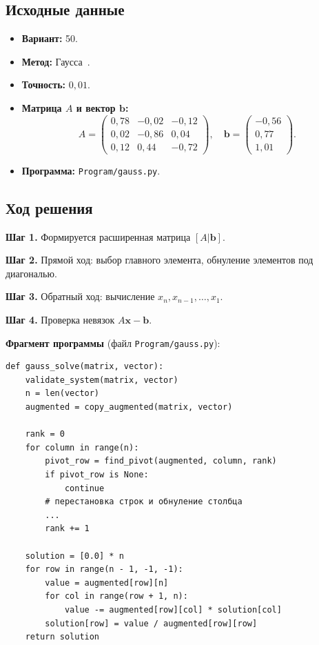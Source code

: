 \documentclass[12pt,a4paper]{scrartcl}
\begin{document}
\subsection{Исходные данные}

\begin{itemize}
 \item \textbf{Вариант:} 50.
 \item \textbf{Метод:} Гаусса~\cite{Samarsky-1989}.
 \item \textbf{Точность:} $0{,}01$.
 \item \textbf{Матрица $A$ и вектор $\mathbf{b}$:}
\[
A=\begin{pmatrix}
0{,}78 & -0{,}02 & -0{,}12\\
0{,}02 & -0{,}86 & 0{,}04\\
0{,}12 & 0{,}44 & -0{,}72
\end{pmatrix},
\quad
\mathbf{b}=\begin{pmatrix}-0{,}56\\ 0{,}77\\ 1{,}01\end{pmatrix}.
\]
 \item \textbf{Программа:} \texttt{Program/gauss.py}.
\end{itemize}

\subsection{Ход решения}

\textbf{Шаг 1.} Формируется расширенная матрица $[A|\mathbf{b}]$.

\textbf{Шаг 2.} Прямой ход: выбор главного элемента, обнуление элементов под диагональю.

\textbf{Шаг 3.} Обратный ход: вычисление $x_n, x_{n-1}, \ldots, x_1$.

\textbf{Шаг 4.} Проверка невязок $A\mathbf{x}-\mathbf{b}$.

\textbf{Фрагмент программы} (файл \texttt{Program/gauss.py}):
\begin{verbatim}
def gauss_solve(matrix, vector):
    validate_system(matrix, vector)
    n = len(vector)
    augmented = copy_augmented(matrix, vector)

    rank = 0
    for column in range(n):
        pivot_row = find_pivot(augmented, column, rank)
        if pivot_row is None:
            continue
        # перестановка строк и обнуление столбца
        ...
        rank += 1

    solution = [0.0] * n
    for row in range(n - 1, -1, -1):
        value = augmented[row][n]
        for col in range(row + 1, n):
            value -= augmented[row][col] * solution[col]
        solution[row] = value / augmented[row][row]
    return solution
\end{verbatim}
\end{document}
